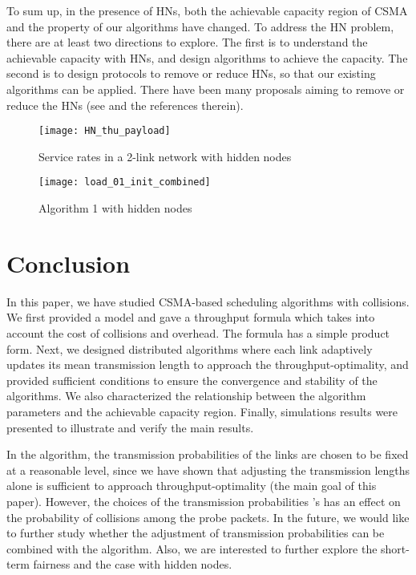 \documentclass{IEEEtran}
\begin{document}
To sum up, in the presence of HNs, both the achievable capacity region
of CSMA and the property of our algorithms have changed. To address
the HN problem, there are at least two directions to explore. The
first is to understand the achievable capacity with HNs, and design
algorithms to achieve the capacity. The second is to design protocols
to remove or reduce HNs, so that our existing algorithms can be applied.
There have been many proposals aiming to remove or reduce the HNs
(see \cite{Jiang-Liew} and the references therein). \begin{figure}
\begin{centering}
\texttt{[image: HN\_thu\_payload]}
\par\end{centering}

\caption{\label{fig:Service-rates-HN}Service rates in a 2-link network with
hidden nodes}

\end{figure}
\begin{figure}
\begin{centering}
\texttt{[image: load\_01\_init\_combined]}
\par\end{centering}

\caption{\label{fig:Algorithm-1-HN}Algorithm 1 with hidden nodes}

\end{figure}



\section{\label{sec:Conclusion}Conclusion}

In this paper, we have studied CSMA-based scheduling algorithms with
collisions. We first provided a model and gave a throughput formula
which takes into account the cost of collisions and overhead. The
formula has a simple product form. Next, we designed distributed algorithms
where each link adaptively updates its mean transmission length to
approach the throughput-optimality, and provided sufficient conditions
to ensure the convergence and stability of the algorithms. We also
characterized the relationship between the algorithm parameters and
the achievable capacity region. Finally, simulations results were
presented to illustrate and verify the main results.

In the algorithm, the transmission probabilities of the links are
chosen to be fixed at a reasonable level, since we have shown that
adjusting the transmission lengths alone is sufficient to approach
throughput-optimality (the main goal of this paper). However, the
choices of the transmission probabilities 's has an effect
on the probability of collisions among the probe packets. In the future,
we would like to further study whether the adjustment of transmission
probabilities can be combined with the algorithm. Also, we are interested
to further explore the short-term fairness and the case with hidden
nodes.
\end{document}
